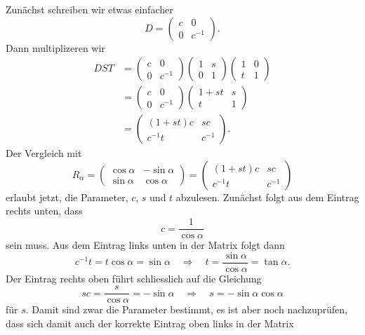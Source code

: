 \begin{loesung}
\begin{teilaufgaben}
\item
Zunächst schreiben wir etwas einfacher 
\[
D=\begin{pmatrix}c&0\\0&c^{-1}\end{pmatrix}.
\]
Dann multiplizeren wir 
\begin{align*}
DST
&=
\begin{pmatrix}c&0\\0&c^{-1}\end{pmatrix}
\begin{pmatrix}1&s\\0&1\end{pmatrix}
\begin{pmatrix}1&0\\t&1\end{pmatrix}
\\
&=
\begin{pmatrix}c&0\\0&c^{-1}\end{pmatrix}
\begin{pmatrix}1+st&s\\t&1\end{pmatrix}
\\
&=
\begin{pmatrix}
(1+st)c&sc\\
c^{-1}t&c^{-1}
\end{pmatrix}.
\end{align*}
Der Vergleich mit 
\[
R_\alpha
=
\begin{pmatrix}
\cos\alpha&-\sin\alpha\\
\sin\alpha& \cos\alpha
\end{pmatrix}
=
\begin{pmatrix}
(1+st)c&sc\\
c^{-1}t&c^{-1}
\end{pmatrix}
\]
erlaubt jetzt, die Parameter, $c$, $s$ und $t$ abzulesen.
Zunächst folgt aus dem Eintrag rechts unten, dass
\[
c=\frac{1}{\cos\alpha}
\]
sein muss.
Aus dem Eintrag links unten in der Matrix folgt dann
\[
c^{-1}t = t\cos\alpha = \sin\alpha
\quad\Rightarrow\quad
t=\frac{\sin\alpha}{\cos\alpha}=\tan\alpha.
\]
Der Eintrag rechts oben führt schliesslich auf die Gleichung
\[
sc=\frac{s}{\cos\alpha}=-\sin\alpha
\quad\Rightarrow\quad
s=-\sin\alpha\cos\alpha
\]
für $s$.
Damit sind zwar die Parameter bestimmt, es ist aber noch nachzuprüfen,
dass sich damit auch der korrekte Eintrag oben links in der Matrix

\end{teilaufgaben}
\end{loesung}
